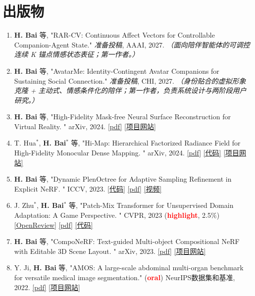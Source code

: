 \documentclass{article}
\begin{document}
\section{出版物}

\begin{enumerate}

\item \textbf{H. Bai} 等, "RAR-CV: Continuous Affect Vectors for Controllable Companion-Agent State." \textit{准备投稿}, AAAI, 2027. \textit{（面向陪伴智能体的可调控连续 K 锚点情感状态表征；第一作者。）} \label{RAR-CV}
\item \textbf{H. Bai} 等, "AvatarMe: Identity-Contingent Avatar Companions for Sustaining Social Connection." \textit{准备投稿}, CHI, 2027. \textit{（身份贴合的虚拟形象克隆 + 主动式、情感条件化的陪伴；第一作者，负责系统设计与两阶段用户研究。）} \label{AvatarMe}
\item \textbf{H. Bai} 等, "High-Fidelity Mask-free Neural Surface Reconstruction for Virtual Reality. " arXiv, 2024. \href{http://arxiv.org/abs/2409.13158}{[pdf]} \href{https://vlislab22.github.io/Hi-NeuS/}{[项目网站]} \label{Hi-NeuS}
\item T. Hua$^*$, \textbf{H. Bai$^*$} 等, "Hi-Map: Hierarchical Factorized Radiance Field for High-Fidelity Monocular Dense Mapping. " arXiv, 2024. \href{https://arxiv.org/abs/2401.03203}{[pdf]} \href{https://github.com/thua919/Hi-Map}{[代码]} \href{https://vlis2022.github.io/fmap/}{[项目网站]} \label{HiMap}
\item \textbf{H. Bai} 等, "Dynamic PlenOctree for Adaptive Sampling Refinement in Explicit NeRF. " ICCV, 2023. \href{https://github.com/164140757/DOT}{[代码]} \href{https://arxiv.org/abs/2307.15333}{[pdf]} \href{https://www.youtube.com/watch?v=i9MnoFhH8Ec}{[视频]} \label{DOT}
\item J. Zhu$^*$, \textbf{H. Bai$^*$} 等, "Patch-Mix Transformer for Unsupervised Domain Adaptation: A Game Perspective. " CVPR, 2023 (\textbf{\textcolor{red}{highlight}}, 2.5\%) \href{https://openreview.net/forum?id=T39lkzQ4iU}{[OpenReview]} \href{https://arxiv.org/abs/2303.13434}{[pdf]} \href{https://github.com/JinjingZhu/PMTrans}{[代码]}
\label{PMTrans}
\item \textbf{H. Bai} 等, "CompoNeRF: Text-guided Multi-object Compositional NeRF with Editable 3D Scene Layout. " arXiv, 2023. \href{https://arxiv.org/abs/2303.13843}{[pdf]} \href{https://vlislab22.github.io/componerf/}{[项目网站]} \label{CompoNeRF}
\item Y. Ji, \textbf{H. Bai} 等, "AMOS: A large-scale abdominal multi-organ benchmark for versatile medical image segmentation." (\textbf{\textcolor{red}{oral}}) NeurIPS数据集和基准, 2022. \href{https://arxiv.org/abs/2206.08023}{[pdf]} \href{http://www.amos.sribd.cn/}{[项目网站]}

\end{enumerate}
\end{document}
